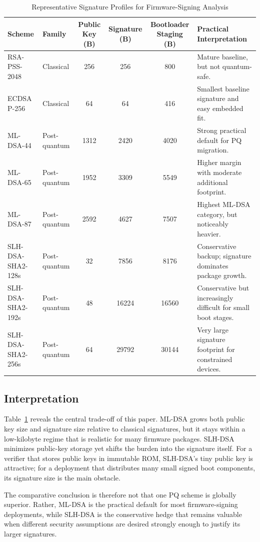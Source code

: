 \begin{table}[!t]
\caption{Representative Signature Profiles for Firmware-Signing Analysis}
\label{tab:profiles}
\centering
\scriptsize
\begin{tabular}{p{1.65in}p{0.82in}cccp{1.58in}}
\toprule
\textbf{Scheme} & \textbf{Family} & \textbf{Public Key (B)} & \textbf{Signature (B)} & \textbf{Bootloader Staging (B)} & \textbf{Practical Interpretation} \\
\midrule
RSA-PSS-2048 & Classical & 256 & 256 & 800 & Mature baseline, but not quantum-safe. \\
ECDSA P-256 & Classical & 64 & 64 & 416 & Smallest baseline signature and easy embedded fit. \\
ML-DSA-44 & Post-quantum & 1312 & 2420 & 4020 & Strong practical default for PQ migration. \\
ML-DSA-65 & Post-quantum & 1952 & 3309 & 5549 & Higher margin with moderate additional footprint. \\
ML-DSA-87 & Post-quantum & 2592 & 4627 & 7507 & Highest ML-DSA category, but noticeably heavier. \\
SLH-DSA-SHA2-128s & Post-quantum & 32 & 7856 & 8176 & Conservative backup; signature dominates package growth. \\
SLH-DSA-SHA2-192s & Post-quantum & 48 & 16224 & 16560 & Conservative but increasingly difficult for small boot stages. \\
SLH-DSA-SHA2-256s & Post-quantum & 64 & 29792 & 30144 & Very large signature footprint for constrained devices. \\
\bottomrule
\end{tabular}
\end{table}

\subsection{Interpretation}

Table~\ref{tab:profiles} reveals the central trade-off of this paper. ML-DSA grows both public key size and signature size relative to classical signatures, but it stays within a low-kilobyte regime that is realistic for many firmware packages. SLH-DSA minimizes public-key storage yet shifts the burden into the signature itself. For a verifier that stores public keys in immutable ROM, SLH-DSA's tiny public key is attractive; for a deployment that distributes many small signed boot components, its signature size is the main obstacle.

The comparative conclusion is therefore not that one PQ scheme is globally superior. Rather, ML-DSA is the practical default for most firmware-signing deployments, while SLH-DSA is the conservative hedge that remains valuable when different security assumptions are desired strongly enough to justify its larger signatures.
